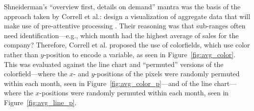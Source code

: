 \documentclass{article} %
\begin{document}
Shneiderman's ``overview first, details on demand'' mantra \cite{shneiderman1996} was the basis of the approach taken by Correll et al.: design a visualization of aggregate data that will make use of pre-attentive processing \cite{correll2012}.  Their reasoning was that sub-ranges often need identification---e.g., which month had the highest average of sales for the company?   Therefore, Correll et al. proposed the use of colorfields, which use color rather than $y$-position to encode a variable, as seen in Figure~\ref{fig:avg_color}.  This was evaluated against the line chart and ``permuted'' versions of the colorfield---where the $x$- and $y$-positions of the pixels were randomly permuted within each month, seen in Figure~\ref{fig:avg_color_p}---and of the line chart---where the $x$-positions were randomly permuted within each month, seen in Figure~\ref{fig:avg_line_p}.
\end{document}
